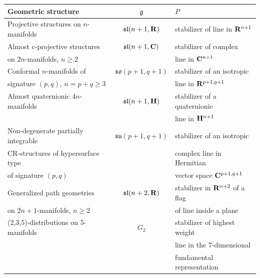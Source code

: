 \documentclass[10pt,a4paper]{amsart}
\numberwithin{equation}{section}
\theoremstyle{definition}
\def\C{{\bf C}}
\def\R{{\bf R}}
\newcommand{\BR}{{\bf R}}
\def\g{{\mathfrak g}}
\begin{document}
\begin{table}[h]\centering
\small\renewcommand{\arraystretch}{1.15}
\begin{tabular}{ |l|c|l| }
\hline
 Geometric structure & $\g$ & $P$ \\
\hline\hline
Projective structures on $n$-manifolds & $\mathfrak{sl}(n+1,\BR)$& stabilizer of line in $\BR^{n+1}$\\
\hline
Almost c-projective structures &$\mathfrak{sl}(n+1,\C)$ &stabilizer of complex \\
on $2n$-manifolds, $n\geq 2$ &&line in $\C^{n+1}$\\
\hline
Conformal $n$-manifolds of &$\mathfrak{so}(p+1,q+1)$ & stabilizer of an isotropic \\
signature $(p,q)$, $n=p+q\geq 3$ & &line in $\BR^{p+1,q+1}$ \\
 \hline
 Almost quaternionic $4n$-manifolds& $\mathfrak{sl}(n+1,{\bf H})$ & stabilizer of a quaternionic \\
 &&line in ${\bf H}^{n+1}$ \\
 \hline
 Non-degenerate partially integrable &$\mathfrak{su}(p+1,q+1)$& stabilizer of an isotropic \\
 CR-structures of hypersurface type & &complex line in Hermitian \\
 of signature $(p,q)$ &&vector space $\C^{p+1,q+1}$\\
 \hline
 Generalized path geometries&$\mathfrak{sl}(n+2,\R)$& stabilizer in $\BR^{n+2}$ of a flag \\
 on $2n+1$-manifolds, $n\geq 2$ && of line inside a plane\\
 \hline
 (2,3,5)-distributions on $5$-manifolds &$G_2$&stabilizer of highest weight\\
 && line in the $7$-dimensional \\
 &&fundamental representation\\
 \hline
\end{tabular}
\end{table}
\end{document}
